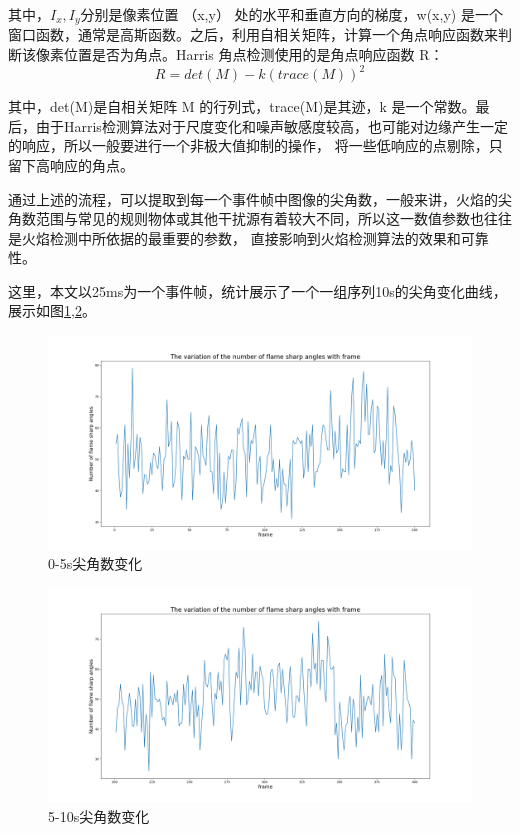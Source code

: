 其中，$I_x,I_y$分别是像素位置 （x,y） 处的水平和垂直方向的梯度，w(x,y) 是一个窗口函数，通常是高斯函数。之后，利用自相关矩阵，计算一个角点响应函数来判断该像素位置是否为角点。Harris 角点检测使用的是角点响应函数 
R：
\begin{equation} 
    R=det(M)-k(trace(M))^2
\end{equation}

其中，det(M)是自相关矩阵 M 的行列式，trace(M)是其迹，k 是一个常数。最后，由于Harris检测算法对于尺度变化和噪声敏感度较高，也可能对边缘产生一定的响应，所以一般要进行一个非极大值抑制的操作，
将一些低响应的点剔除，只留下高响应的角点。

通过上述的流程，可以提取到每一个事件帧中图像的尖角数，一般来讲，火焰的尖角数范围与常见的规则物体或其他干扰源有着较大不同，所以这一数值参数也往往是火焰检测中所依据的最重要的参数，
直接影响到火焰检测算法的效果和可靠性。

这里，本文以25ms为一个事件帧，统计展示了一个一组序列10s的尖角变化曲线，展示如图\ref{6},\ref{7}。
\begin{figure}[ht]
    \centering
    \includegraphics[width=\textwidth]{figures/extract_tip_01.png}
    \caption{0-5s尖角数变化}
    \label{6}
    \end{figure}

\begin{figure}[ht]
    \centering
    \includegraphics[width=\textwidth]{figures/extract_tip_02.png}
    \caption{5-10s尖角数变化}
    \label{7}
    \end{figure}

